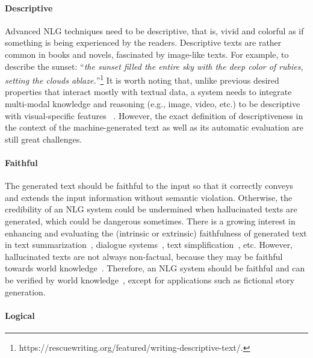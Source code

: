 \paragraph{Descriptive}

Advanced NLG techniques need to be descriptive, that is, vivid and colorful as if something is being experienced by the readers.
Descriptive texts are rather common in books and novels, fascinated by image-like texts.
For example, to describe the sunset: ``\textit{the sunset filled the entire sky with the deep color of rubies, setting the clouds ablaze.}''\footnote{
https://rescuewriting.org/featured/writing-descriptive-text/.}
It is worth noting that, unlike previous desired properties that interact mostly with textual data, a system needs to integrate multi-modal knowledge and reasoning (e.g., image, video, etc.) to be descriptive with visual-specific features ~\cite{yin-ordonez-2017-obj2text,DBLP:conf/ai/Shi0Z21,shi-etal-2021-enhancing}.
However, the exact definition of descriptiveness in the context of the machine-generated text as well as its automatic evaluation are still great challenges.



\paragraph{Faithful}

The generated text should be faithful to the input so that it correctly conveys and extends the input information without semantic violation.
Otherwise, the credibility of an NLG system could be undermined when hallucinated texts are generated, which could be dangerous sometimes.
There is a growing interest in enhancing and evaluating the (intrinsic or extrinsic) faithfulness of generated text in text summarization~\cite{cao2018faithful,maynez-etal-2020-faithfulness,ladhak-etal-2022-faithful}, dialogue systems~\cite{honovich-etal-2021-q2}, text simplification~\cite{devaraj-etal-2022-evaluating}, etc.
However, hallucinated texts are not always non-factual, because they may be faithful towards world knowledge~\cite{cao-etal-2022-hallucinated}.
Therefore, an NLG system should be faithful and can be verified by world knowledge~\cite{thorne-etal-2018-fever,Chen_Bao_Sun_Zhang_Chen_Zhou_Xiao_Li_2022}, except for applications such as fictional story generation.



\paragraph{Logical}


